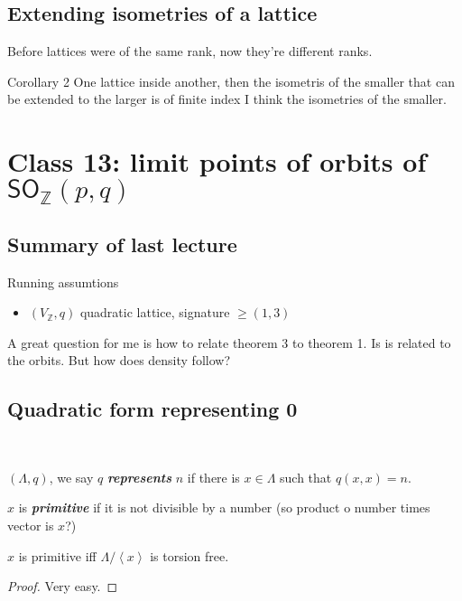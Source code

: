 \subsection{Extending isometries of a lattice}

Before lattices were of the same rank, now they're different ranks.

\begin{thing4}{Corollary 2}\leavevmode
	One lattice inside another, then the isometris of the smaller that can be extended to the larger is of finite index I think the isometries of the smaller.
\end{thing4}

\section{Class 13: limit points of orbits of $\mathsf{SO}_{\mathbb{Z}}(p,q)$}

\subsection{Summary of last lecture}

Running assumtions
\begin{itemize}
\item $(V_{\mathbb{Z}},q)$ quadratic lattice, signature   $\geq (1,3)$
\end{itemize}

A great question for me is how to relate theorem 3 to theorem 1. Is is related to the orbits. But how does density follow?

\subsection{Quadratic form representing 0}
\
\begin{defn}\leavevmode
	 $(\Lambda,q)$, we say $q$ \textit{\textbf{represents}} $n$ if there is $x\in\Lambda$ such that $q(x,x)=n$.

	  $x$ is  \textit{\textbf{primitive}} if it is not divisible by a number (so product o number times vector is  $x$?)
\end{defn}

\begin{remark}\leavevmode
	$x$ is primitive iff $\Lambda/\left<x\right> $ is torsion free.
\end{remark}
\begin{proof}\leavevmode
	Very easy.
\end{proof}

